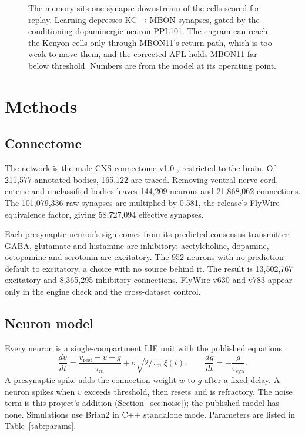 \documentclass[11pt]{article}
\newcommand{\KCMBON}{KC$\rightarrow$MBON}
\begin{document}
\begin{figure}[t]
\caption{The memory sits one synapse downstream of the cells scored for replay. Learning depresses \KCMBON{} synapses, gated by the conditioning dopaminergic neuron PPL101. The engram can reach the Kenyon cells only through MBON11's return path, which is too weak to move them, and the corrected APL holds MBON11 far below threshold. Numbers are from the model at its operating point.}
\label{fig:circuit}
\end{figure}

\section{Methods}

\subsection{Connectome}
The network is the male CNS connectome v1.0 \citep{berg2026}, restricted to the brain. Of 211,577 annotated bodies, 165,122 are traced. Removing ventral nerve cord, enteric and unclassified bodies leaves 144,209 neurons and 21,868,062 connections. The 101,079,336 raw synapses are multiplied by 0.581, the release's FlyWire-equivalence factor, giving 58,727,094 effective synapses.

Each presynaptic neuron's sign comes from its predicted consensus transmitter. GABA, glutamate and histamine are inhibitory; acetylcholine, dopamine, octopamine and serotonin are excitatory. The 952 neurons with no prediction default to excitatory, a choice with no source behind it. The result is 13,502,767 excitatory and 8,365,295 inhibitory connections. FlyWire v630 and v783 appear only in the engine check and the cross-dataset control.

\subsection{Neuron model}
Every neuron is a single-compartment LIF unit with the published equations \citep{shiu2024}:
\begin{equation}
\frac{dv}{dt} = \frac{v_{\mathrm{rest}} - v + g}{\tau_m} + \sigma\sqrt{2/\tau_m}\,\xi(t), \qquad \frac{dg}{dt} = -\frac{g}{\tau_{\mathrm{syn}}}.
\label{eq:lif}
\end{equation}
A presynaptic spike adds the connection weight $w$ to $g$ after a fixed delay. A neuron spikes when $v$ exceeds threshold, then resets and is refractory. The noise term is this project's addition (Section~\ref{sec:noise}); the published model has none. Simulations use Brian2 in C++ standalone mode. Parameters are listed in Table~\ref{tab:params}.
\end{document}
